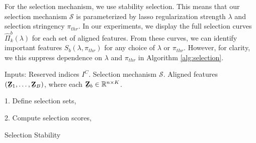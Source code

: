 For the selection mechanism, we use stability selection. This means that our
selection mechanism $\mathcal{S}$ is parameterized by lasso regularization
strength $\lambda$ and selection stringency $\pi_{thr}$. In our experiments, we
display the full selection curves $\hat{\Pi}^{b}_{k}\left(\lambda\right)$ for
each set of aligned features. From these curves, we can identify important
features $S_{b}\left(\lambda, \pi_{thr}\right)$ for any choice of $\lambda$ or
$\pi_{thr}$. However, for clarity, we this suppress dependence on $\lambda$ and
$\pi_{thr}$ in Algorithm \ref{alg:selection}.

\begin{algorithm}[H]
  \SetAlgoLined
  Inputs: Reserved indices $I^{C}$. Selection mechanism $\mathcal{S}$. Aligned
  features $\left(\underaccent{\bar}{\mathbf{Z}}_{1}, \dots,
  \underaccent{\bar}{\mathbf{Z}}_{B}\right)$, where each
  $\underaccent{\bar}{\mathbf{Z}}_{b} \in \reals^{n \times K}$.

  1. Define selection sets,


  2. Compute selection scores,

  \caption{Selection Stability}
  \label{alg:selection}
\end{algorithm}
